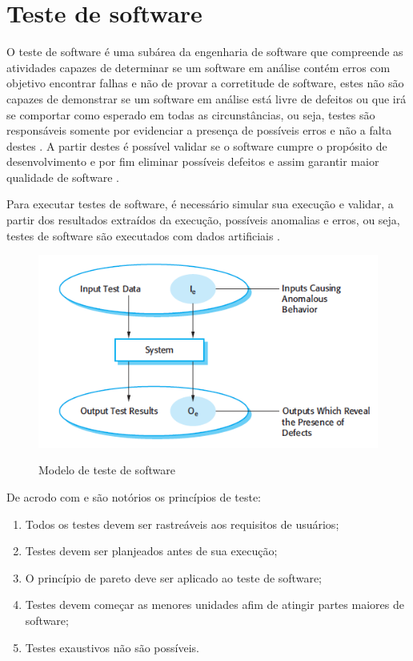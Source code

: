 \documentclass[
	12pt,				%
	oneside,			%
	a4paper,			%
	english,			%
	brazil				%
	]{abntex2ppgsi}
\begin{document}
\section{Teste de software}
O teste de software é uma subárea da engenharia de software que compreende as atividades capazes de determinar se um software em análise contém erros \cite{gerhart1975} com objetivo encontrar falhas e não de provar a corretitude de software, estes não são capazes de demonstrar se um software em análise está livre de defeitos ou que irá se comportar como esperado em todas as circunstâncias, ou seja, testes são responsáveis somente por evidenciar a presença de possíveis erros e não a falta destes \cite{pfleeger2010}. A partir destes é possível validar se o software cumpre o propósito de desenvolvimento e por fim eliminar possíveis defeitos e assim garantir maior qualidade de software \cite{Sommerville2010}. 

Para executar testes de software, é necessário simular sua execução e validar, a partir dos resultados extraídos da execução, possíveis anomalias e erros, ou seja, testes de software são executados com dados artificiais \cite{Sommerville2010}.

\begin{figure}[H]%
	\centering
 	  \caption{Modelo de teste de software}
		\includegraphics{modelo-teste.png}
	\label{fig:tipos-custo-arvore}
\end{figure}

De acrodo com \cite{pressman2009engenharia} e \cite{Davis1995} são notórios os princípios de teste: 

\begin{enumerate}
\item Todos os testes devem ser rastreáveis aos requisitos de usuários;
\item Testes devem ser planjeados antes de sua execução;
\item O princípio de pareto deve ser aplicado ao teste de software;
\item Testes devem começar as menores unidades afim de atingir partes maiores de software;
\item Testes exaustivos não são possíveis.
\end{enumerate}
\end{document}
